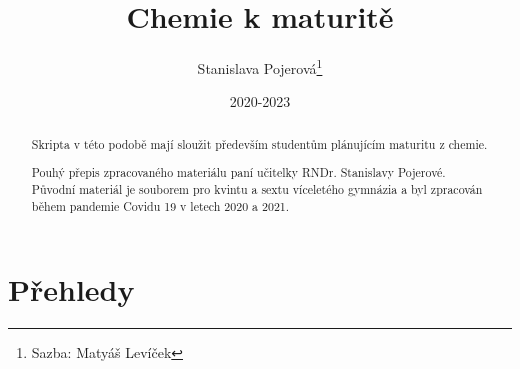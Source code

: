 \documentclass{article}
\title{Chemie k maturitě}
\author{Stanislava Pojerová\thanks{Sazba: Matyáš Levíček}}
\date{2020-2023}
\begin{document}
    \maketitle

    \begin{abstract}
        Skripta v této podobě mají sloužit především studentům plánujícím maturitu z chemie. 
        
        Pouhý přepis zpracovaného materiálu paní učitelky RNDr. Stanislavy Pojerové. Původní materiál je souborem pro kvintu a sextu víceletého gymnázia a byl zpracován během pandemie Covidu 19 v letech 2020 a 2021.
    \end{abstract}

    \newpage
    \renewcommand{\contentsname}{Obsah podle tématu}
    \tableofcontents
    \newpage
    
    
    
    
    
    
    
    
    
    
    
    
    
    
    
    
    
    
    
\newlength\origheight
\setlength\origheight{\textheight}



\section{Přehledy}
    
    
    
    
\end{document}
